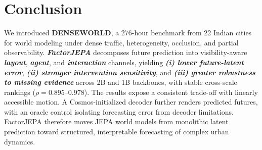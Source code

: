 \section{\textbf{Conclusion}}

We introduced \textbf{DENSEWORLD}, a 276-hour benchmark from 22 Indian cities for
world modeling under dense traffic, heterogeneity, occlusion, and partial
observability. \textbf{\emph{FactorJEPA}} decomposes future prediction into
visibility-aware \textbf{\emph{layout}}, \textbf{\emph{agent}}, and
\textbf{\emph{interaction}} channels, yielding
\textbf{\emph{(i) lower future-latent error}},
\textbf{\emph{(ii) stronger intervention sensitivity}}, and
\textbf{\emph{(iii) greater robustness to missing evidence}}
across 2B and 1B backbones, with stable cross-scale rankings
($\rho=0.895$--$0.978$). The results expose a consistent trade-off with
linearly accessible motion. A Cosmos-initialized decoder further renders
predicted futures, with an oracle control isolating forecasting error from
decoder limitations. FactorJEPA therefore moves JEPA world models from
monolithic latent prediction toward structured, interpretable forecasting of
complex urban dynamics.